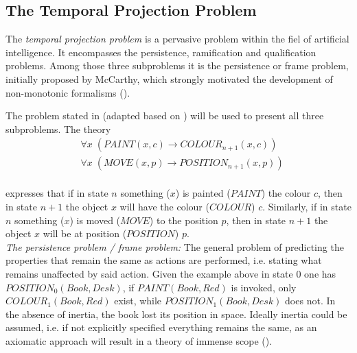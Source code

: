 \documentclass{extarticle}
\begin{document}
\subsection{The Temporal Projection Problem}
The \emph{temporal projection problem} is a pervasive problem within the fiel of artificial intelligence. It encompasses the persistence, ramification and qualification problems. Among those three subproblems it is the persistence or frame problem, initially proposed by McCarthy, which strongly motivated the development of non-monotonic formalisms (\cite{BOCHMAN2007557}).


The problem stated in \cite{stanford2016frame} (adapted based on \cite{ginsberg1987reasoning}) will be used to present all three subproblems. 
The theory 
\begin{equation*}
\begin{split}
&\forall x \; (PAINT(x,c) \to COLOUR_{n+1}(x,c)) \\
&\forall x \; (MOVE(x,p) \to POSITION_{n+1}(x,p)) \\
\end{split}
\end{equation*}

expresses that if in state $n$ something ($x$) is painted ($PAINT$) the colour $c$, then in state $n+1$ the object $x$ will have the colour ($COLOUR$) $c$. Similarly, if in state $n$ something ($x$) is moved ($MOVE$) to the position $p$, then in state $n+1$ the object $x$ will be at position ($POSITION$) $p$. \\

\emph{The persistence problem / frame problem: } The general problem of predicting the properties that remain the same as actions are performed, i.e. stating what remains unaffected by said action. Given the example above in state 0 one has $POSITION_0(Book, Desk)$, if $PAINT(Book,Red)$ is invoked, only $COLOUR_{1}(Book, Red)$ exist, while  $POSITION_1(Book, Desk)$ does not. In the absence of inertia, the book lost its position in space. Ideally inertia could be assumed, i.e. if not explicitly specified everything remains the same, as an axiomatic approach will result in a theory of immense scope (\cite{BOCHMAN2007557,lifschitz2015dramatic}).\\
\end{document}
